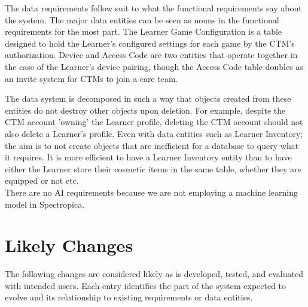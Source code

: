 \documentclass[12pt]{article}
\begin{document}
The data requirements follow suit to what the functional requirements say about the system. The major data entities can be seen as nouns in the functional requirements for the most part. The Learner Game Configuration is a table designed to hold the Learner's configured settings for each game by the CTM's authorization. Device and Access Code are two entities that operate together in the case of the Learner's device pairing, though the Access Code table doubles as an invite system for CTMs to join a care team. 

The data system is decomposed in such a way that objects created from these entities do not destroy other objects upon deletion. For example, despite the CTM account 'owning' the Learner profile, deleting the CTM account should not also delete a Learner's profile. Even with data entities such as Learner Inventory; the aim is to not create objects that are inefficient for a database to query what it requires. It is more efficient to have a Learner Inventory entity than to have either the Learner store their cosmetic items in the same table, whether they are equipped or not etc.\\

There are no AI requirements because we are not employing a machine learning model in Spectropica.

\section{Likely Changes}

The following changes are considered likely as \progname{} is developed, tested,
and evaluated with intended users. Each entry identifies the part of the system
expected to evolve and its relationship to existing requirements or data
entities.
\end{document}
